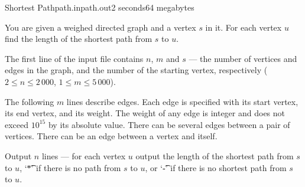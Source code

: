\begin{problem}{Shortest Path}{path.in}{path.out}{2 seconds}{64 megabytes}


You are given a weighed directed graph and a vertex $s$ in it.
For each vertex $u$ find the length of the shortest path from $s$ to $u$.

\InputFile

The first line of the input file contains $n$, $m$ and $s$ --- the number
of vertices and edges in the graph, and the number of the starting
vertex, respectively ($2 \le n \le 2\,000$, $1 \le m \le 5\,000$). 

The following $m$ lines describe edges. Each
edge is specified with its start vertex, its end vertex, and its weight.
The weight of any edge is integer and does not exceed $10^{15}$ by its 
absolute value. There can be several edges between a pair of vertices. 
There can be an edge between a vertex and itself.

\OutputFile

Output $n$ lines --- for each vertex $u$ output the length
of the shortest path from $s$ to $u$, `\t{*}' if there is no path
from $s$ to $u$, or `\t{-}' if there is no shortest path from $s$ 
to $u$.

\Example

\begin{example}
%
\end{example}

\end{problem}
